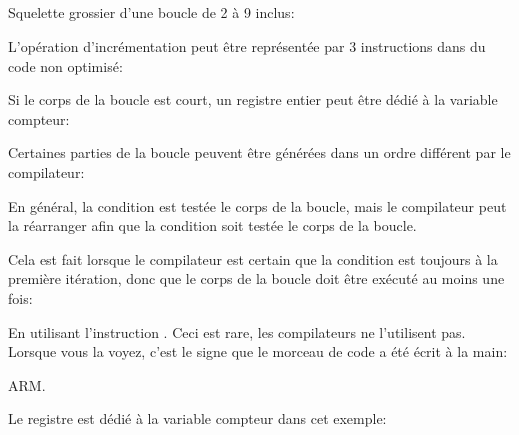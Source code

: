 ﻿%
\subsection{\Conclusion{}}

Squelette grossier d'une boucle de 2 à 9 inclus:



L'opération d'incrémentation peut être représentée par 3 instructions dans du code
non optimisé:



Si le corps de la boucle est court, un registre entier peut être dédié à la variable
compteur:



Certaines parties de la boucle peuvent être générées dans un ordre différent par
le compilateur:



En général, la condition est testée  le corps de la boucle, mais le compilateur
peut la réarranger afin que la condition soit testée  le corps de la boucle.

Cela est fait lorsque le compilateur est certain que la condition est toujours 
à la première itération, donc que le corps de la boucle doit être exécuté au moins
une fois:




En utilisant l'instruction . Ceci est rare, les compilateurs ne l'utilisent
pas.
Lorsque vous la voyez, c'est le signe que le morceau de code a été écrit à la main:



ARM. 

Le registre  est dédié à la variable compteur dans cet exemple:




